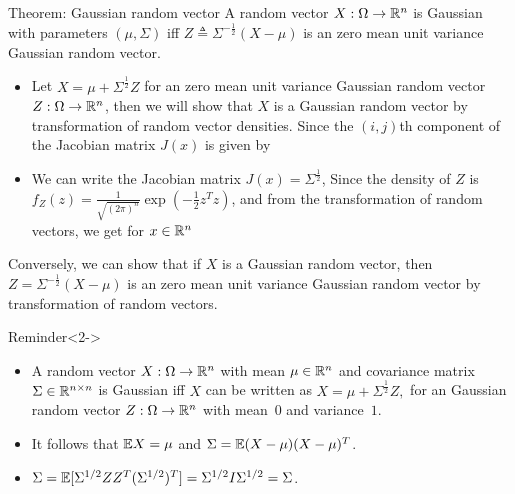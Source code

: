 \documentclass[12pt,aspectratio=169]{beamer}
\begin{document}
\begin{frame}
\begin{block}{Theorem: Gaussian random vector}
A random vector $X: \Omega\to\mathbb{R}^n$ is Gaussian with parameters $(\mu, \Sigma)$ iff $Z \triangleq \Sigma^{-\frac{1}{2}}(X-\mu)$ is an \iid zero mean unit variance Gaussian random vector. 
\end{block}
\end{frame}


\begin{frame}
\begin{Proof}
\begin{itemize}
\item <1-> Let  $X = \mu + \Sigma^{\frac{1}{2}}Z$ for an \iid zero mean unit variance Gaussian random vector $Z:\Omega\to\mathbb{R}^n$, 
then we will show that $X$ is a Gaussian random vector by transformation of random vector densities. 
Since the $(i,j)$th component of the Jacobian matrix $J(x)$ is given by 
\item <2->We can write the Jacobian matrix $J(x) = \Sigma^{\frac{1}{2}}$, 
Since the density of $Z$ is $f_Z(z) = \frac{1}{\sqrt{(2\pi)^n}}\exp(-\frac{1}{2}z^Tz)$, 
and from the transformation of random vectors, we get for $x\in \mathbb{R}^n$
\end{itemize}
\end{Proof}
\end{frame}

\begin{frame}
\begin{Proof}
Conversely, we can show that if $X$ is a Gaussian random vector, then $Z = \Sigma^{-\frac{1}{2}}(X-\mu)$ is an \iid zero mean unit variance Gaussian random vector by transformation of random vectors. 
\end{Proof}

\begin{block}{Reminder}<2->
\begin{itemize}
\item A random vector $X:\Omega\to\mathbb{R}^n$ with mean $\mu \in \mathbb{R}^n$ and covariance matrix $\Sigma \in \mathbb{R}^{n\times n}$ is Gaussian iff $X$ can be written as 
$
X = \mu + \Sigma^{\frac{1}{2}}Z,
$
for an  \iid Gaussian random vector $Z: \Omega \to \mathbb{R}^n$ with mean~$0$ and variance~$1$. 
\item <3->It follows that $\mathbb{E} X = \mu$ and $\Sigma = \mathbb{E}(X-\mu)(X-\mu)^T$. 
\item <4-> $\Sigma = \mathbb{E}[\Sigma^{1/2}ZZ^T(\Sigma^{1/2})^T] = \Sigma^{1/2}I\Sigma^{1/2} = \Sigma$.
\end{itemize}
\end{block}
\end{frame}
\end{document}
